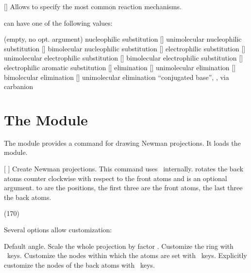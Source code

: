 \documentclass{chemmacros-manual}
\begin{document}
\begin{commands}
  []
    Allows to specify the most common reaction mechanisms.
\end{commands}
 can have one of the following values:
\begin{commands}
    (empty, no opt. argument) nucleophilic substitution \mech
  []
    unimolecular nucleophilic substitution \mech[1]
  []
    bimolecular nucleophilic substitution \mech[2]
  []
    electrophilic substitution \mech[se]
  []
    unimolecular electrophilic substitution \mech[1e]
  []
    bimolecular electrophilic substitution \mech[2e]
  []
    electrophilic aromatic substitution \mech[ar]
  []
    elimination \mech[e]
  []
    unimolecular elimination \mech[e1]
  []
    bimolecular elimination \mech[e2]
  []
    unimolecular elimination \enquote{conjugated base}, \ie, via carbanion
    \mech[cb]
\end{commands}

\section{The  Module}\label{sec:newman-module}
The  module provides a command for drawing Newman
projections.  It loads the  module.
\begin{commands}
  [%
    ]
    Create Newman projections.  This command uses \TikZ\ internally.
     rotates the back atoms counter clockwise with respect to the
    front atoms and is an optional argument.   to  are the
    positions, the first three are the front atoms, the last three the back
    atoms.
\end{commands}

\begin{example}
  \newman{} \newman(170){}
    
\end{example}

Several options allow customization:
\begin{options}
    Default angle.
    Scale the whole projection by factor .
  \Initial
    Customize the ring with \TikZ\ keys.
  \Initial
    Customize the nodes within which the atoms are set with \TikZ\ keys.
  \Initial
    Explicitly customize the nodes of the back atoms with \TikZ\ keys.
\end{options}
\end{document}
